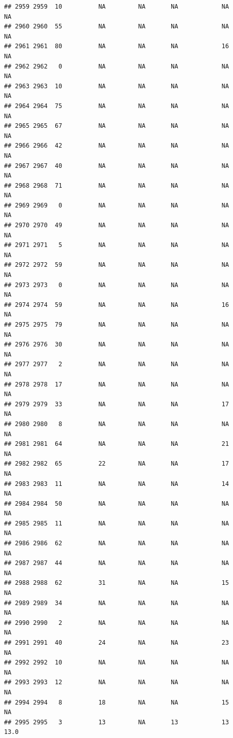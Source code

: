 \documentclass[man]{apa6}
\begin{document}
\begin{verbatim}
## 2959 2959  10          NA         NA       NA            NA       NA
## 2960 2960  55          NA         NA       NA            NA       NA
## 2961 2961  80          NA         NA       NA            16       NA
## 2962 2962   0          NA         NA       NA            NA       NA
## 2963 2963  10          NA         NA       NA            NA       NA
## 2964 2964  75          NA         NA       NA            NA       NA
## 2965 2965  67          NA         NA       NA            NA       NA
## 2966 2966  42          NA         NA       NA            NA       NA
## 2967 2967  40          NA         NA       NA            NA       NA
## 2968 2968  71          NA         NA       NA            NA       NA
## 2969 2969   0          NA         NA       NA            NA       NA
## 2970 2970  49          NA         NA       NA            NA       NA
## 2971 2971   5          NA         NA       NA            NA       NA
## 2972 2972  59          NA         NA       NA            NA       NA
## 2973 2973   0          NA         NA       NA            NA       NA
## 2974 2974  59          NA         NA       NA            16       NA
## 2975 2975  79          NA         NA       NA            NA       NA
## 2976 2976  30          NA         NA       NA            NA       NA
## 2977 2977   2          NA         NA       NA            NA       NA
## 2978 2978  17          NA         NA       NA            NA       NA
## 2979 2979  33          NA         NA       NA            17       NA
## 2980 2980   8          NA         NA       NA            NA       NA
## 2981 2981  64          NA         NA       NA            21       NA
## 2982 2982  65          22         NA       NA            17       NA
## 2983 2983  11          NA         NA       NA            14       NA
## 2984 2984  50          NA         NA       NA            NA       NA
## 2985 2985  11          NA         NA       NA            NA       NA
## 2986 2986  62          NA         NA       NA            NA       NA
## 2987 2987  44          NA         NA       NA            NA       NA
## 2988 2988  62          31         NA       NA            15       NA
## 2989 2989  34          NA         NA       NA            NA       NA
## 2990 2990   2          NA         NA       NA            NA       NA
## 2991 2991  40          24         NA       NA            23       NA
## 2992 2992  10          NA         NA       NA            NA       NA
## 2993 2993  12          NA         NA       NA            NA       NA
## 2994 2994   8          18         NA       NA            15       NA
## 2995 2995   3          13         NA       13            13     13.0

\end{verbatim}
\end{document}
